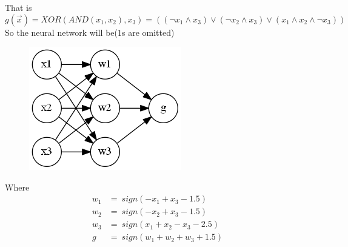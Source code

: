 \documentclass{article}
\begin{document}
\begin{tlist}{3}
\begin{center}
\begin{tabular}{|c|c|c|c|}
		\end{tabular}
	\end{center}
	That is $$g(\vec{x})=XOR(AND(x_1,x_2),x_3)=((\lnot x_1 \land x_3 )\lor(\lnot x_2 \land x_3)\lor(x_1 \land x_2 \land \lnot x_3))$$
	So the neural network will be($1$s are omitted)
	\begin{figure}[H]\centering\includegraphics{5.png}\end{figure}
	Where
	\begin{align*}
		w_1 & =\ sign(-x_1+x_3-1.5)    \\
		w_2 & =\ sign(-x_2+x_3-1.5)    \\
		w_3 & =\ sign(x_1+x_2-x_3-2.5) \\
		g   & =\ sign(w_1+w_2+w_3+1.5) \\
	\end{align*}
\end{tlist}
\end{document}
